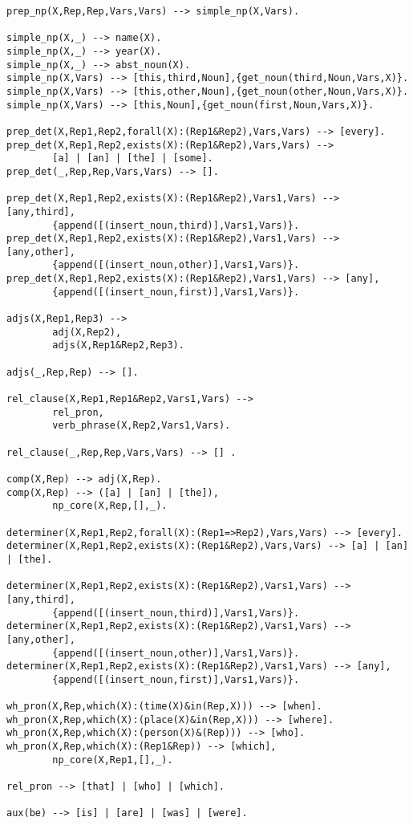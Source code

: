 \begin{verbatim}
prep_np(X,Rep,Rep,Vars,Vars) --> simple_np(X,Vars).

simple_np(X,_) --> name(X).
simple_np(X,_) --> year(X).
simple_np(X,_) --> abst_noun(X).
simple_np(X,Vars) --> [this,third,Noun],{get_noun(third,Noun,Vars,X)}.
simple_np(X,Vars) --> [this,other,Noun],{get_noun(other,Noun,Vars,X)}.
simple_np(X,Vars) --> [this,Noun],{get_noun(first,Noun,Vars,X)}.

prep_det(X,Rep1,Rep2,forall(X):(Rep1&Rep2),Vars,Vars) --> [every].
prep_det(X,Rep1,Rep2,exists(X):(Rep1&Rep2),Vars,Vars) --> 
        [a] | [an] | [the] | [some].
prep_det(_,Rep,Rep,Vars,Vars) --> [].

prep_det(X,Rep1,Rep2,exists(X):(Rep1&Rep2),Vars1,Vars) --> [any,third],
        {append([(insert_noun,third)],Vars1,Vars)}.
prep_det(X,Rep1,Rep2,exists(X):(Rep1&Rep2),Vars1,Vars) --> [any,other],
        {append([(insert_noun,other)],Vars1,Vars)}.
prep_det(X,Rep1,Rep2,exists(X):(Rep1&Rep2),Vars1,Vars) --> [any],
        {append([(insert_noun,first)],Vars1,Vars)}.

adjs(X,Rep1,Rep3) --> 
        adj(X,Rep2),
        adjs(X,Rep1&Rep2,Rep3).

adjs(_,Rep,Rep) --> [].

rel_clause(X,Rep1,Rep1&Rep2,Vars1,Vars) --> 
        rel_pron,
        verb_phrase(X,Rep2,Vars1,Vars).

rel_clause(_,Rep,Rep,Vars,Vars) --> [] .

comp(X,Rep) --> adj(X,Rep).
comp(X,Rep) --> ([a] | [an] | [the]),
        np_core(X,Rep,[],_).  

determiner(X,Rep1,Rep2,forall(X):(Rep1=>Rep2),Vars,Vars) --> [every].
determiner(X,Rep1,Rep2,exists(X):(Rep1&Rep2),Vars,Vars) --> [a] | [an] | [the].

determiner(X,Rep1,Rep2,exists(X):(Rep1&Rep2),Vars1,Vars) --> [any,third],
        {append([(insert_noun,third)],Vars1,Vars)}.
determiner(X,Rep1,Rep2,exists(X):(Rep1&Rep2),Vars1,Vars) --> [any,other],
        {append([(insert_noun,other)],Vars1,Vars)}.
determiner(X,Rep1,Rep2,exists(X):(Rep1&Rep2),Vars1,Vars) --> [any],
        {append([(insert_noun,first)],Vars1,Vars)}.

wh_pron(X,Rep,which(X):(time(X)&in(Rep,X))) --> [when].
wh_pron(X,Rep,which(X):(place(X)&in(Rep,X))) --> [where].
wh_pron(X,Rep,which(X):(person(X)&(Rep))) --> [who].
wh_pron(X,Rep,which(X):(Rep1&Rep)) --> [which],
        np_core(X,Rep1,[],_).

rel_pron --> [that] | [who] | [which].

aux(be) --> [is] | [are] | [was] | [were].


\end{verbatim}
